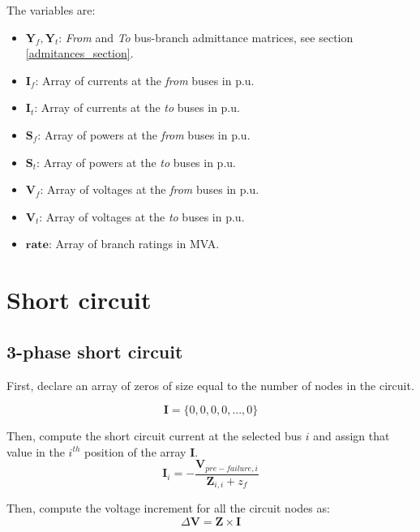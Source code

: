 \documentclass[11pt,fleqn]{book} %
\begin{document}
The variables are:

\begin{itemize}
	\item $\textbf{Y}_f, \textbf{Y}_t$: \textit{From} and \textit{To} bus-branch admittance matrices, see section \ref{admitances_section}.
	\item $\textbf{I}_f$: Array of currents at the \textit{from} buses in p.u.
	\item $\textbf{I}_t$: Array of currents at the \textit{to} buses in p.u.
	\item $\textbf{S}_f$: Array of powers at the \textit{from} buses in p.u.
	\item $\textbf{S}_t$: Array of powers at the \textit{to} buses in p.u.
	\item $\textbf{V}_f$: Array of voltages at the \textit{from} buses in p.u.
	\item $\textbf{V}_t$: Array of voltages at the \textit{to} buses in p.u.
	\item $\textbf{rate}$: Array of branch ratings in MVA.
\end{itemize}



\chapter{Short circuit}

%
%

\section{3-phase short circuit}

First, declare an array of zeros of size equal to the number of nodes in the circuit.

$$
\textbf{I} = \{0, 0, 0, 0, ..., 0\}
$$

Then, compute the short circuit current at the selected bus $i$ and assign that value in the $i^{th}$ position of the array $\textbf{I}$.
\begin{equation}
\textbf{I}_i = - \frac{\textbf{V}_{pre-failure, i}}{\textbf{Z}_{i, i} + z_f}
\end{equation}

Then, compute the voltage increment for all the circuit nodes as:
\begin{equation}
\Delta \textbf{V} = \textbf{Z} \times \textbf{I}
\end{equation}
\end{document}

